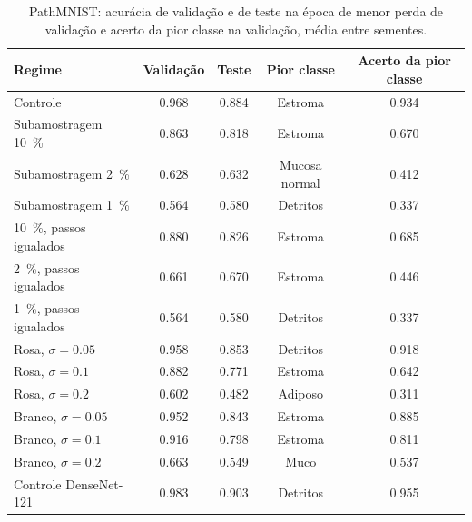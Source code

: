 \begin{table}[H]
    \centering
    \caption{PathMNIST: acurácia de validação e de teste na época de menor perda
    de validação e acerto da pior classe na validação, média entre sementes.}
    \label{tab:pm-desempenho}
    \footnotesize
    \begin{tabular}{lcccc}
        \toprule
        Regime & Validação & Teste & Pior classe & Acerto da pior classe \\
        \midrule
        Controle                        & \num{0,968} & \num{0,884} & Estroma    & \num{0,934} \\
        Subamostragem \SI{10}{\percent} & \num{0,863} & \num{0,818} & Estroma    & \num{0,670} \\
        Subamostragem \SI{2}{\percent}  & \num{0,628} & \num{0,632} & Mucosa normal & \num{0,412} \\
        Subamostragem \SI{1}{\percent}  & \num{0,564} & \num{0,580} & Detritos   & \num{0,337} \\
        \SI{10}{\percent}, passos igualados & \num{0,880} & \num{0,826} & Estroma & \num{0,685} \\
        \SI{2}{\percent}, passos igualados  & \num{0,661} & \num{0,670} & Estroma & \num{0,446} \\
        \SI{1}{\percent}, passos igualados  & \num{0,564} & \num{0,580} & Detritos & \num{0,337} \\
        Rosa, $\sigma = \num{0,05}$   & \num{0,958} & \num{0,853} & Detritos & \num{0,918} \\
        Rosa, $\sigma = \num{0,1}$    & \num{0,882} & \num{0,771} & Estroma  & \num{0,642} \\
        Rosa, $\sigma = \num{0,2}$    & \num{0,602} & \num{0,482} & Adiposo  & \num{0,311} \\
        Branco, $\sigma = \num{0,05}$ & \num{0,952} & \num{0,843} & Estroma  & \num{0,885} \\
        Branco, $\sigma = \num{0,1}$  & \num{0,916} & \num{0,798} & Estroma  & \num{0,811} \\
        Branco, $\sigma = \num{0,2}$  & \num{0,663} & \num{0,549} & Muco     & \num{0,537} \\
        Controle DenseNet-121         & \num{0,983} & \num{0,903} & Detritos & \num{0,955} \\
        \bottomrule
    \end{tabular}
\end{table}

